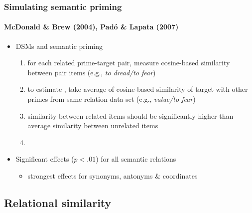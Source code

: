\begin{frame}
  \frametitle{Simulating semantic priming}
  \framesubtitle{McDonald \& Brew (2004), Padó \& Lapata (2007)}
 \begin{itemize}
 \item DSMs and semantic priming
  \begin{enumerate}
  \item for each related prime-target pair, 
  measure cosine-based similarity between pair items (e.g.,
    \emph{to dread/to fear})
    \pause
  \item to estimate , take average of cosine-based similarity of target with other
    primes from same relation data-set (e.g., \emph{value/to fear})
    \pause
  \item similarity between related items should be significantly higher
    than average similarity between unrelated items
    \item[]
  \end{enumerate}
  \pause
\item Significant effects ($p < .01$) for all semantic relations 
  \begin{itemize}
  \item strongest effects for synonyms, antonyms \& coordinates
  \end{itemize}
  \end{itemize}
\end{frame}


\subsection{Relational similarity}


